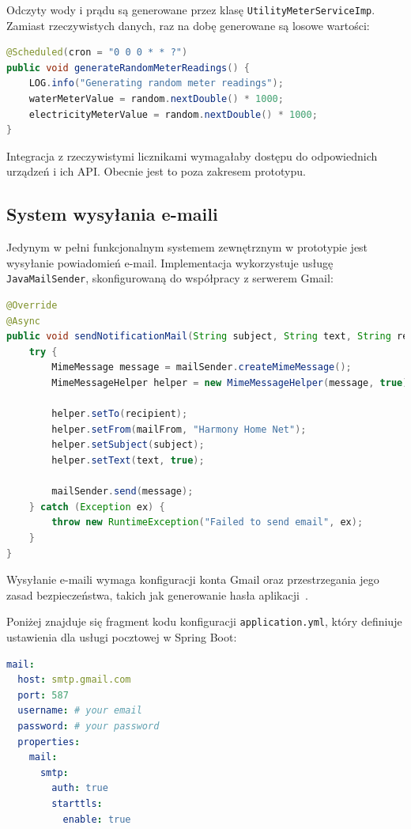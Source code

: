 Odczyty wody i prądu są generowane przez klasę \texttt{UtilityMeterServiceImp}. Zamiast rzeczywistych danych, raz na dobę generowane są losowe wartości:

\begin{lstlisting}[language=Java, caption=Fragment klasy \texttt{UtilityMeterServiceImp}]
@Scheduled(cron = "0 0 0 * * ?")
public void generateRandomMeterReadings() {
    LOG.info("Generating random meter readings");
    waterMeterValue = random.nextDouble() * 1000;
    electricityMeterValue = random.nextDouble() * 1000;
}
\end{lstlisting}

Integracja z rzeczywistymi licznikami wymagałaby dostępu do odpowiednich urządzeń i ich API. Obecnie jest to poza zakresem prototypu.

\subsection{System wysyłania e-maili}

Jedynym w pełni funkcjonalnym systemem zewnętrznym w prototypie jest wysyłanie powiadomień e-mail. Implementacja wykorzystuje usługę \texttt{JavaMailSender}, skonfigurowaną do współpracy z serwerem Gmail:

\begin{lstlisting}[language=Java, caption=Fragment klasy \texttt{MailServiceImp}]
@Override
@Async
public void sendNotificationMail(String subject, String text, String recipient) {
    try {
        MimeMessage message = mailSender.createMimeMessage();
        MimeMessageHelper helper = new MimeMessageHelper(message, true);

        helper.setTo(recipient);
        helper.setFrom(mailFrom, "Harmony Home Net");
        helper.setSubject(subject);
        helper.setText(text, true);

        mailSender.send(message);
    } catch (Exception ex) {
        throw new RuntimeException("Failed to send email", ex);
    }
}
\end{lstlisting}

Wysyłanie e-maili wymaga konfiguracji konta Gmail oraz przestrzegania jego zasad bezpieczeństwa, takich jak generowanie hasła aplikacji~\cite{gmail_api}.

Poniżej znajduje się fragment kodu konfiguracji \texttt{application.yml}, który definiuje ustawienia dla usługi pocztowej w Spring Boot:

\begin{lstlisting}[language=YAML, caption=Fragment konfiguracji poczty w \texttt{application.yml}]
mail:
  host: smtp.gmail.com
  port: 587
  username: # your email
  password: # your password
  properties:
    mail:
      smtp:
        auth: true
        starttls:
          enable: true
\end{lstlisting}

